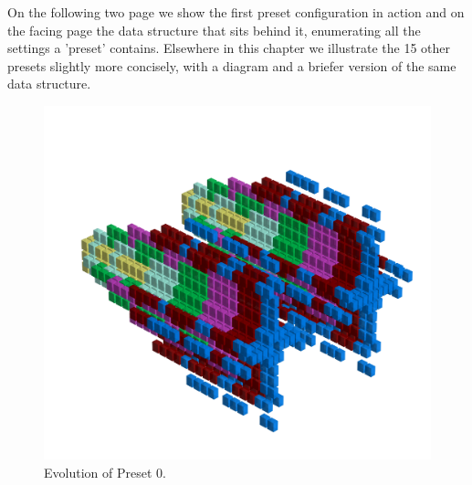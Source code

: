 On the following two page we show the first preset configuration in action and on the facing page the 
data structure that sits behind it, enumerating all the settings a 'preset' contains. Elsewhere in this
chapter we illustrate the 15 other presets slightly more concisely, with a diagram and a briefer version
of the same data structure.

\clearpage                                                                 
\begin{figure}[H]                                                          
  \centering                                                             
  \begin{adjustbox}{width=14cm,center}                                   
  \includegraphics[width=14cm]{src/presets/pattern0-45.png}%
  \end{adjustbox}                                                        
\caption{Evolution of Preset 0.}                                           
\end{figure}                                                               
\clearpage                                                                 
                                                                           

